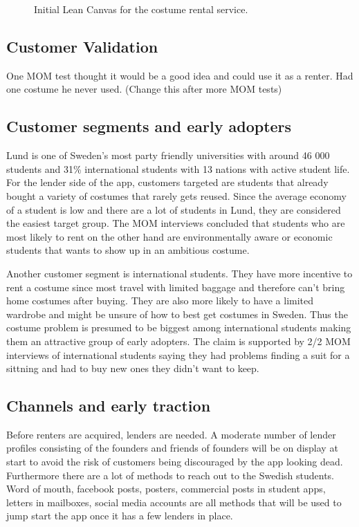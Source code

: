 \documentclass[a4paper, titlepage]{article}
\begin{document}
\begin{figure}[htbp]
  \centering
  
  \caption{Initial Lean Canvas for the costume rental service.}
  \label{fig:leancanvas}
\end{figure}

\subsection{Customer Validation}
One MOM test thought it would be a good idea and could use it as a renter. Had one costume he never used. (Change this after more MOM tests)

\subsection{Customer segments and early adopters}
Lund is one of Sweden's most party friendly universities with around 46 000 students and 31\% international students \parencite{lu-facts} with 13 nations \parencite{lu-nations} with active student life. For the lender side of the app, customers targeted are students that already bought a variety of costumes that rarely gets reused. Since the average economy of a student is low and there are a lot of students in Lund, they are considered the easiest target group. The MOM interviews concluded that students who are most likely to rent on the other hand are environmentally aware or economic students that wants to show up in an ambitious costume. 

Another customer segment is international students. They have more incentive to rent a costume since most travel with limited baggage and therefore can't bring home costumes after buying. They are also more likely to have a limited wardrobe and might be unsure of how to best get costumes in Sweden. Thus the costume problem is presumed to be biggest among international students making them an attractive group of early adopters. The claim is supported by 2/2 MOM interviews of international students saying they had problems finding a suit for a sittning and had to buy new ones they didn't want to keep.

\subsection{Channels and early traction}
Before renters are acquired, lenders are needed. A moderate number of lender profiles consisting of the founders and friends of founders will be on display at start to avoid the risk of customers being discouraged by the app looking dead. Furthermore there are a lot of methods to reach out to the Swedish students. Word of mouth, facebook posts, posters, commercial posts in student apps, letters in mailboxes, social media accounts are all methods that will be used to jump start the app once it has a few lenders in place.
\end{document}
